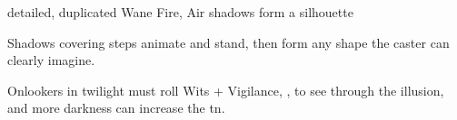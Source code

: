   {detailed, duplicated}%
  {Wane}%
  {Fire, Air}%
  {}%
  { shadows form a silhouette}%
  {
    Shadows covering  steps animate and stand, then form any shape the caster can clearly imagine.

    \setcounter{track}{\value{spellCost}}
    \addtocounter{track}{7}
    Onlookers in twilight must roll Wits + Vigilance, , to see through the illusion, and more darkness can increase the \gls{tn}.
  }

